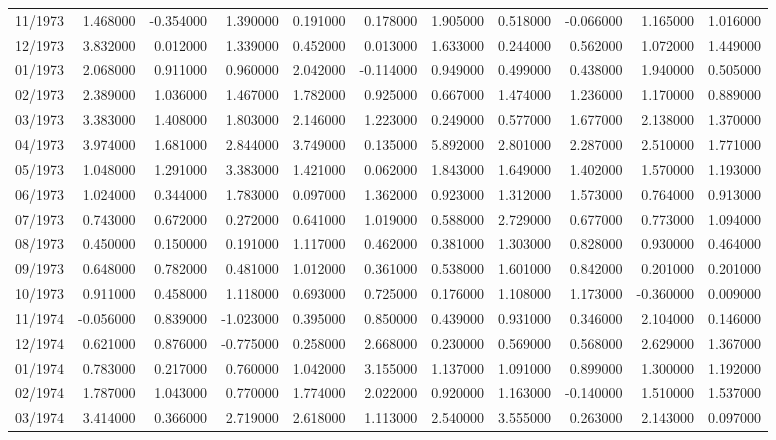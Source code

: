 \begin{tabular}{lrrrrrrrrrr}
11/1973 & 1.468000 & -0.354000 & 1.390000 & 0.191000 & 0.178000 & 1.905000 & 0.518000 & -0.066000 & 1.165000 & 1.016000 \\
12/1973 & 3.832000 & 0.012000 & 1.339000 & 0.452000 & 0.013000 & 1.633000 & 0.244000 & 0.562000 & 1.072000 & 1.449000 \\
01/1973 & 2.068000 & 0.911000 & 0.960000 & 2.042000 & -0.114000 & 0.949000 & 0.499000 & 0.438000 & 1.940000 & 0.505000 \\
02/1973 & 2.389000 & 1.036000 & 1.467000 & 1.782000 & 0.925000 & 0.667000 & 1.474000 & 1.236000 & 1.170000 & 0.889000 \\
03/1973 & 3.383000 & 1.408000 & 1.803000 & 2.146000 & 1.223000 & 0.249000 & 0.577000 & 1.677000 & 2.138000 & 1.370000 \\
04/1973 & 3.974000 & 1.681000 & 2.844000 & 3.749000 & 0.135000 & 5.892000 & 2.801000 & 2.287000 & 2.510000 & 1.771000 \\
05/1973 & 1.048000 & 1.291000 & 3.383000 & 1.421000 & 0.062000 & 1.843000 & 1.649000 & 1.402000 & 1.570000 & 1.193000 \\
06/1973 & 1.024000 & 0.344000 & 1.783000 & 0.097000 & 1.362000 & 0.923000 & 1.312000 & 1.573000 & 0.764000 & 0.913000 \\
07/1973 & 0.743000 & 0.672000 & 0.272000 & 0.641000 & 1.019000 & 0.588000 & 2.729000 & 0.677000 & 0.773000 & 1.094000 \\
08/1973 & 0.450000 & 0.150000 & 0.191000 & 1.117000 & 0.462000 & 0.381000 & 1.303000 & 0.828000 & 0.930000 & 0.464000 \\
09/1973 & 0.648000 & 0.782000 & 0.481000 & 1.012000 & 0.361000 & 0.538000 & 1.601000 & 0.842000 & 0.201000 & 0.201000 \\
10/1973 & 0.911000 & 0.458000 & 1.118000 & 0.693000 & 0.725000 & 0.176000 & 1.108000 & 1.173000 & -0.360000 & 0.009000 \\
11/1974 & -0.056000 & 0.839000 & -1.023000 & 0.395000 & 0.850000 & 0.439000 & 0.931000 & 0.346000 & 2.104000 & 0.146000 \\
12/1974 & 0.621000 & 0.876000 & -0.775000 & 0.258000 & 2.668000 & 0.230000 & 0.569000 & 0.568000 & 2.629000 & 1.367000 \\
01/1974 & 0.783000 & 0.217000 & 0.760000 & 1.042000 & 3.155000 & 1.137000 & 1.091000 & 0.899000 & 1.300000 & 1.192000 \\
02/1974 & 1.787000 & 1.043000 & 0.770000 & 1.774000 & 2.022000 & 0.920000 & 1.163000 & -0.140000 & 1.510000 & 1.537000 \\
03/1974 & 3.414000 & 0.366000 & 2.719000 & 2.618000 & 1.113000 & 2.540000 & 3.555000 & 0.263000 & 2.143000 & 0.097000 \\

\end{tabular}
